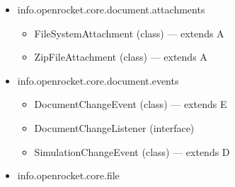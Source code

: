 \documentclass{amsdtx}
\begin{document}
\begin{itemize}
\begin{itemize}
\begin{itemize}
    \item
      Attachment (class) --- extends A
    \item
      ConditionListener (class) --- implements S
    \item
      DecalImageImpl (class) --- implements D
    \item
      DecalRegistry (class)
    \item
      FileType (enum)
    \item
      OpenRocketDocument (class) --- implements C
    \item
      OpenRocketDocumentFactory (class)
    \item
      Simulation (class) --- implements C
    \item
      Status (enum)
    \item
      StorageOptions (class) --- implements C
    \item
      UndoRedoListener (interface) --- extends E
    \item
      defining (class)
    \item
      is (class)
    \end{itemize}
  \item
    info.openrocket.core.document.attachments

    \begin{itemize}
    
    \item
      FileSystemAttachment (class) --- extends A
    \item
      ZipFileAttachment (class) --- extends A
    \end{itemize}
  \item
    info.openrocket.core.document.events

    \begin{itemize}
    
    \item
      DocumentChangeEvent (class) --- extends E
    \item
      DocumentChangeListener (interface)
    \item
      SimulationChangeEvent (class) --- extends D
    \end{itemize}
  \item
    info.openrocket.core.file

    \begin{itemize}
    

\end{itemize}
\end{itemize}
\end{itemize}
\end{document}
